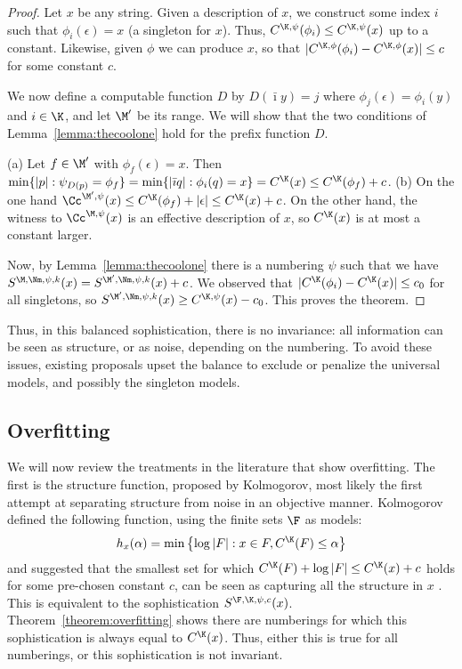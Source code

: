 \begin{proof}
Let $x$ be any string. Given a description of $x$, we construct some index $i$ such that $\phi_i(\epsilon) = x$ (a singleton for $x$). Thus, $C^{\K, \psi}(\phi_i) \leq C^{\K,\psi}(x)$ up to a constant. Likewise, given $\phi$ we can produce $x$, so that $|C^{\K,\phi}(\phi_i)-C^{\K, \phi}(x)|\le c$ for some constant $c$. 

We now define a computable function $D$ by $D(\bar\imath y)=j$ where $\phi_j(\epsilon) = \phi_i(y)$ and $i \in \K$, and let $\M'$ be its range.  We will show that the two conditions of Lemma~\ref{lemma:thecoolone} hold for the prefix function $D$.

(a) Let $f \in \M'$ with $\phi_f(\epsilon) = x$. Then $\min\{|p|:\psi_{D(p)}=\phi_f\}=\min\{|\bar\imath q|:\phi_i(q)=x\}=C^{\K}(x) \le C^{\K}(\phi_f)+c$. (b) On the one hand $\Cc^{\M',\psi}(x)\le C^\K(\phi_f)+|\epsilon|\le C^\K(x)+c$. On the other hand, the witness to $\Cc^{\M,\psi}(x)$ is an effective description of $x$, so $C^{\K}(x)$ is at most a constant larger. 

Now, by Lemma~\ref{lemma:thecoolone} there is a numbering $\psi$ such that we have $S^{\M,\Nm,\psi,k}(x) =S^{\M',\Nm,\psi,k}(x) + c$. We observed that $|C^{\K}(\phi_i)-C^{\K}(x)|\le c_0$ for all singletons, so $S^{\M',\Nm,\psi, k}(x)\ge C^{\K,\psi}(x)-c_0$. This proves the theorem.
\end{proof}

\noindent Thus, in this balanced sophistication, there is no invariance: all information can be seen as structure, or as noise, depending on the numbering. To avoid these issues, existing proposals upset the balance to exclude or penalize the universal models, and possibly the singleton models. 

\subsection{Overfitting}

We will now review the treatments in the literature that show overfitting. The first is the structure function, proposed by Kolmogorov, most likely the first attempt at separating structure from noise in an objective manner. Kolmogorov defined the following function, using the finite sets $\F$ as models:
\[
h_x(\alpha) = \min \left \{\log |F| : x \in F, C^\K(F) \leq \alpha \right \} 
\]
and suggested that the smallest set for which $C^\K(F) + \log|F| \leq C^\K(x) + c$ holds for some pre-chosen constant $c$, can be seen as capturing all the structure in $x$ \cite{cover1985kolmogorov}. This is equivalent to the sophistication $S^{\F,\K,\psi,c}(x)$. Theorem~\ref{theorem:overfitting} shows there are numberings for which this sophistication is always equal to $C^\K(x)$. Thus, either this is true for all numberings, or this sophistication is not invariant.
 
